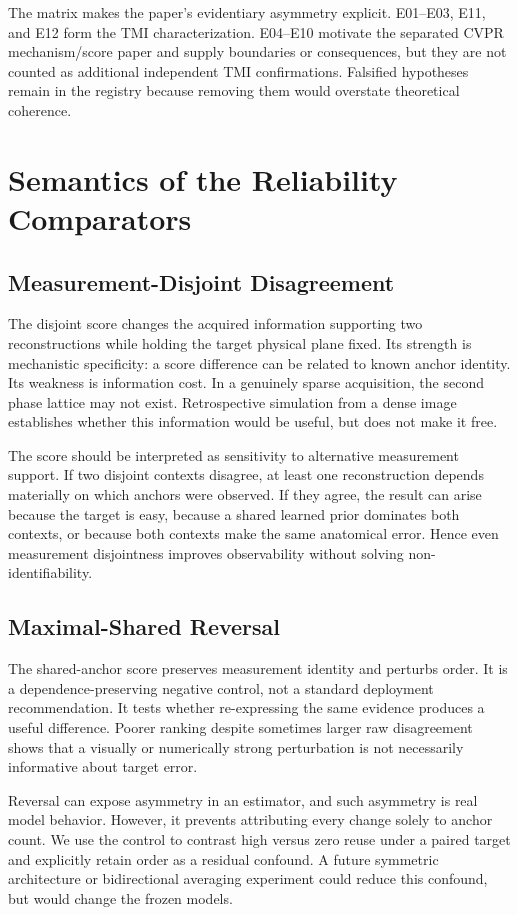 \documentclass[journal,10pt]{IEEEtran}
\begin{document}
The matrix makes the paper's evidentiary asymmetry explicit. E01--E03, E11, and E12 form the TMI characterization. E04--E10 motivate the separated CVPR mechanism/score paper and supply boundaries or consequences, but they are not counted as additional independent TMI confirmations. Falsified hypotheses remain in the registry because removing them would overstate theoretical coherence.

\section{Semantics of the Reliability Comparators}
\subsection{Measurement-Disjoint Disagreement}
The disjoint score changes the acquired information supporting two reconstructions while holding the target physical plane fixed. Its strength is mechanistic specificity: a score difference can be related to known anchor identity. Its weakness is information cost. In a genuinely sparse acquisition, the second phase lattice may not exist. Retrospective simulation from a dense image establishes whether this information would be useful, but does not make it free.

The score should be interpreted as sensitivity to alternative measurement support. If two disjoint contexts disagree, at least one reconstruction depends materially on which anchors were observed. If they agree, the result can arise because the target is easy, because a shared learned prior dominates both contexts, or because both contexts make the same anatomical error. Hence even measurement disjointness improves observability without solving non-identifiability.

\subsection{Maximal-Shared Reversal}
The shared-anchor score preserves measurement identity and perturbs order. It is a dependence-preserving negative control, not a standard deployment recommendation. It tests whether re-expressing the same evidence produces a useful difference. Poorer ranking despite sometimes larger raw disagreement shows that a visually or numerically strong perturbation is not necessarily informative about target error.

Reversal can expose asymmetry in an estimator, and such asymmetry is real model behavior. However, it prevents attributing every change solely to anchor count. We use the control to contrast high versus zero reuse under a paired target and explicitly retain order as a residual confound. A future symmetric architecture or bidirectional averaging experiment could reduce this confound, but would change the frozen models.
\end{document}
